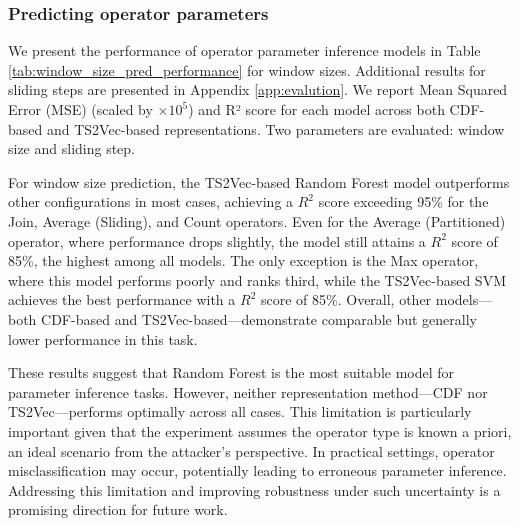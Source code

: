 \subsubsection{Predicting operator parameters}
We present the performance of operator parameter inference models in Table \ref{tab:window_size_pred_performance} for window sizes. Additional results for sliding steps are presented in Appendix \ref{app:evalution}. We report Mean Squared Error (MSE) (scaled by $\times10^5$) and R² score for each model across both CDF-based and TS2Vec-based representations. Two parameters are evaluated: window size and sliding step.

For window size prediction, the TS2Vec-based Random Forest model outperforms other configurations in most cases, achieving a $R^2$ score exceeding 95\% for the Join, Average (Sliding), and Count operators. Even for the Average (Partitioned) operator, where performance drops slightly, the model still attains a $R^2$ score of 85\%, the highest among all models. The only exception is the Max operator, where this model performs poorly and ranks third, while the TS2Vec-based SVM achieves the best performance with a $R^2$ score of 85\%. Overall, other models—both CDF-based and TS2Vec-based—demonstrate comparable but generally lower performance in this task.

These results suggest that Random Forest is the most suitable model for parameter inference tasks. However, neither representation method—CDF nor TS2Vec—performs optimally across all cases. This limitation is particularly important given that the experiment assumes the operator type is known a priori, an ideal scenario from the attacker's perspective. In practical settings, operator misclassification may occur, potentially leading to erroneous parameter inference. Addressing this limitation and improving robustness under such uncertainty is a promising direction for future work.

